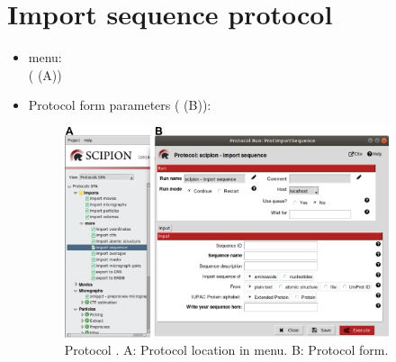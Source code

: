 \section{Import sequence protocol}
\label{app:importSequence}%

\begin{itemize}
  \item \scipion menu:\\
   ( (A))\\
  
  \item Protocol form parameters ( (B)):\\
  
  \begin{figure}[H]
    \centering 
    \captionsetup{width=.7\linewidth} 
    \includegraphics[width=0.90\textwidth]{Images_appendix/Fig104.pdf}
    \caption{Protocol . A: Protocol location in \scipion menu. B: Protocol form.}
    \label{fig:app_protocol_sequence_1}
   \end{figure}
  

\end{itemize}
